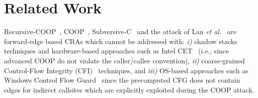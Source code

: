 \section{Related Work}
\label{chapter:Related_Work}

% 

Recursive-COOP~\cite{crane:readactor++}, COOP~\cite{schuster:coop}, Subversive-C~\cite{subversive-c:lettner} and the attack of Lan \textit{et al.}~\cite{loop:oriented} are forward-edge based CRAs which cannot be addressed with:
\textit{i)}  shadow stacks techniques and hardware-based approaches such as Intel CET~\cite{intel:cet} (i.e., since advanced COOP do not violate the caller/callee convention), 
\textit{ii)} coarse-grained Control-Flow Integrity (CFI)~\cite{abadi:cfi2, abadi:cfi} techniques, and 
\textit{iii)} OS-based approaches such as Windows Control Flow Guard~\cite{windows:cfguard} 
since the precomputed CFG does not contain edges for indirect callsites which are explicitly exploited during the COOP attack.

